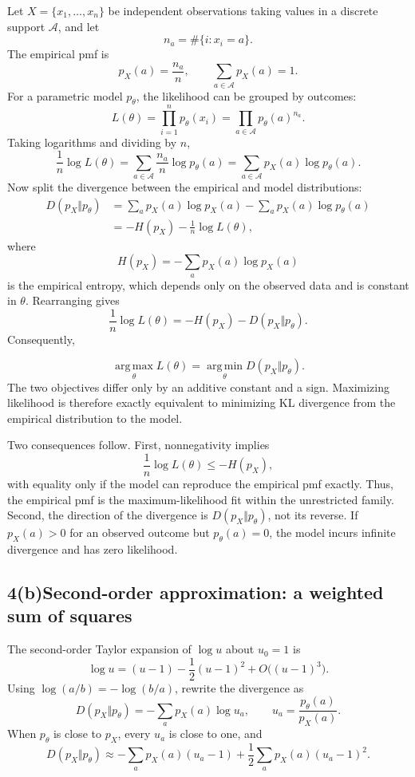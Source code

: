 \documentclass[11pt,letterpaper]{article}
\newcommand{\problemPart}[2]{\subsection*{#1\quad #2}}
\begin{document}
Let $X=\{x_1,\ldots,x_n\}$ be independent observations taking values in a discrete support $\mathcal A$, and let
\[
  n_a=\#\{i:x_i=a\}.
\]
The empirical pmf is
\[
  p_X(a)=\frac{n_a}{n},
  \qquad
  \sum_{a\in\mathcal A}p_X(a)=1.
\]
For a parametric model $p_\theta$, the likelihood can be grouped by outcomes:
\[
  L(\theta)
  =\prod_{i=1}^n p_\theta(x_i)
  =\prod_{a\in\mathcal A}p_\theta(a)^{n_a}.
\]
Taking logarithms and dividing by $n$,
\[
  \frac1n\log L(\theta)
  =\sum_{a\in\mathcal A}\frac{n_a}{n}\log p_\theta(a)
  =\sum_{a\in\mathcal A}p_X(a)\log p_\theta(a).
\]
Now split the divergence between the empirical and model distributions:
\begin{align*}
D(p_X\Vert p_\theta)
&=\sum_a p_X(a)\log p_X(a)
  -\sum_a p_X(a)\log p_\theta(a)\\
&=-H(p_X)-\frac1n\log L(\theta),
\end{align*}
where
\[
  H(p_X)=-\sum_a p_X(a)\log p_X(a)
\]
is the empirical entropy, which depends only on the observed data and is constant in $\theta$. Rearranging gives
\[
  \frac1n\log L(\theta)
  =-H(p_X)-D(p_X\Vert p_\theta).
\]
Consequently,
\begin{resultbox}
\[
  \boxed{
  \operatorname*{arg\,max}_\theta L(\theta)
  =\operatorname*{arg\,min}_\theta D(p_X\Vert p_\theta).}
\]
The two objectives differ only by an additive constant and a sign. Maximizing likelihood is therefore exactly equivalent to minimizing KL divergence from the empirical distribution to the model.
\end{resultbox}

Two consequences follow. First, nonnegativity implies
\[
  \frac1n\log L(\theta)\le-H(p_X),
\]
with equality only if the model can reproduce the empirical pmf exactly. Thus, the empirical pmf is the maximum-likelihood fit within the unrestricted family. Second, the direction of the divergence is $D(p_X\Vert p_\theta)$, not its reverse. If $p_X(a)>0$ for an observed outcome but $p_\theta(a)=0$, the model incurs infinite divergence and has zero likelihood.

\problemPart{4(b)}{Second-order approximation: a weighted sum of squares}

The second-order Taylor expansion of $\log u$ about $u_0=1$ is
\[
  \log u=(u-1)-\frac12(u-1)^2+O\bigl((u-1)^3\bigr).
\]
Using $\log(a/b)=-\log(b/a)$, rewrite the divergence as
\[
  D(p_X\Vert p_\theta)
  =-\sum_a p_X(a)\log u_a,
  \qquad
  u_a=\frac{p_\theta(a)}{p_X(a)}.
\]
When $p_\theta$ is close to $p_X$, every $u_a$ is close to one, and
\[
  D(p_X\Vert p_\theta)
  \approx
  -\sum_a p_X(a)(u_a-1)
  +\frac12\sum_a p_X(a)(u_a-1)^2.
\]
\end{document}
